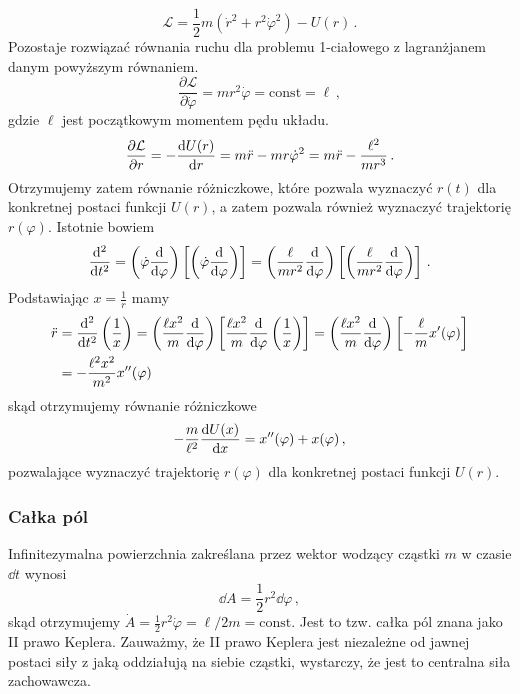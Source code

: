\documentclass[../main.tex]{subfiles}
\begin{document}
\begin{equation*}
    \mathcal{L}=\frac{1}{2}m(\dot{r}^2+r^2\dot{\varphi}^2)-U(r)\,.
\end{equation*}
Pozostaje rozwiązać równania ruchu dla problemu 1-ciałowego z lagranżjanem danym powyższym równaniem.
\begin{equation*}
    \frac{\partial\mathcal{L}}{\partial\dot\varphi}=mr^2\dot\varphi=\text{const}=\ell\,,
\end{equation*}
gdzie \(\ell\) jest początkowym momentem pędu układu.
\begin{equation*}
    \frac{\partial \mathcal{L}}{\partial r}=-\dv{U(r)}{r}=m\ddot r-mr\dot{\varphi}^2=m\ddot r-\frac{\ell^2}{mr^3}\,.
\end{equation*}
Otrzymujemy zatem równanie różniczkowe, które pozwala wyznaczyć \(r(t)\) dla konkretnej postaci funkcji \(U(r)\), a zatem pozwala również wyznaczyć trajektorię \(r(\varphi)\). Istotnie bowiem
\begin{equation*}
    \dv[2]{}{t}=\left(\dot\varphi\dv{}{\varphi}\right)\left[\left(\dot\varphi\dv{}{\varphi}\right)\right]=\left(\frac{\ell}{mr^2}\dv{}{\varphi}\right)\left[\left(\frac{\ell}{mr^2}\dv{}{\varphi}\right)\right]\,.
\end{equation*}
Podstawiając \(x=\frac{1}{r}\) mamy
\begin{equation*}
\begin{split}
    \ddot r&=\dv[2]{}{t}\left(\frac{1}{x}\right)=\left(\frac{\ell x^2}{m}\dv{}{\varphi}\right)\left[\frac{\ell x^2}{m}\dv{}{\varphi}\left(\frac{1}{x}\right)\right]=\left(\frac{\ell x^2}{m}\dv{}{\varphi}\right)\left[-\frac{\ell}{m}x'(\varphi)\right]\\
    &=-\frac{\ell^2x^2}{m^2}x''(\varphi)
\end{split}
\end{equation*}
skąd otrzymujemy równanie różniczkowe
\begin{equation*}
    -\frac{m}{\ell^2}\dv{U(x)}{x}=x''(\varphi)+x(\varphi)\,,
\end{equation*}
pozwalające wyznaczyć trajektorię \(r(\varphi)\) dla konkretnej postaci funkcji \(U(r)\). 
\subsubsection{Całka pól}
Infinitezymalna powierzchnia zakreślana przez wektor wodzący cząstki \(m\) w czasie \(\dd{t}\) wynosi
\begin{equation*}
    \dd A=\frac{1}{2}r^2\dd{\varphi}\,,
\end{equation*}
skąd otrzymujemy \(\dot A=\frac{1}{2}r^2\dot \varphi=\ell/2m=\text{const}\). Jest to tzw. całka pól znana jako II prawo Keplera. Zauważmy, że II prawo Keplera jest niezależne od jawnej postaci siły z jaką oddziałują na siebie cząstki, wystarczy, że jest to centralna siła zachowawcza.
\end{document}
